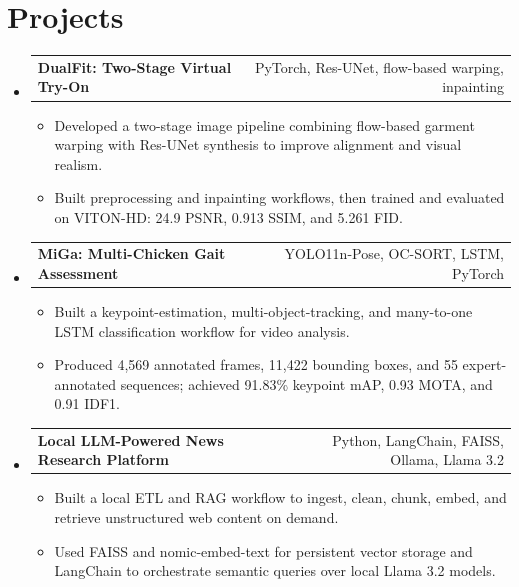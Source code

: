 \documentclass[letterpaper,10pt]{article}
\makeatletter
\newcommand{\resumeSingleHeading}[2]{\vspace{1pt}\item\begin{tabular*}{0.985\textwidth}{l@{\extracolsep{\fill}}r}\textbf{#1} & \small#2 \\ \end{tabular*}\vspace{2pt}}
\newcommand{\resumeItem}[1]{\item\small{#1}}
\newcommand{\resumeSubHeadingListStart}{\begin{itemize}[leftmargin=0.0in,label={}]}
\newcommand{\resumeSubHeadingListEnd}{\end{itemize}\vspace{-2pt}}
\newcommand{\resumeItemListStart}{\begin{itemize}[leftmargin=0.17in]}
\newcommand{\resumeItemListEnd}{\end{itemize}\vspace{2pt}}
\makeatother
\begin{document}
\section{Projects}
\resumeSubHeadingListStart
  \resumeSingleHeading{DualFit: Two-Stage Virtual Try-On}{PyTorch, Res-UNet, flow-based warping, inpainting}
  \resumeItemListStart
    \resumeItem{Developed a two-stage image pipeline combining flow-based garment warping with Res-UNet synthesis to improve alignment and visual realism.}
    \resumeItem{Built preprocessing and inpainting workflows, then trained and evaluated on VITON-HD: 24.9 PSNR, 0.913 SSIM, and 5.261 FID.}
  \resumeItemListEnd
  \resumeSingleHeading{MiGa: Multi-Chicken Gait Assessment}{YOLO11n-Pose, OC-SORT, LSTM, PyTorch}
  \resumeItemListStart
    \resumeItem{Built a keypoint-estimation, multi-object-tracking, and many-to-one LSTM classification workflow for video analysis.}
    \resumeItem{Produced 4,569 annotated frames, 11,422 bounding boxes, and 55 expert-annotated sequences; achieved 91.83\% keypoint mAP, 0.93 MOTA, and 0.91 IDF1.}
  \resumeItemListEnd
  \resumeSingleHeading{Local LLM-Powered News Research Platform}{Python, LangChain, FAISS, Ollama, Llama 3.2}
  \resumeItemListStart
    \resumeItem{Built a local ETL and RAG workflow to ingest, clean, chunk, embed, and retrieve unstructured web content on demand.}
    \resumeItem{Used FAISS and nomic-embed-text for persistent vector storage and LangChain to orchestrate semantic queries over local Llama 3.2 models.}
  \resumeItemListEnd
\resumeSubHeadingListEnd
\end{document}
